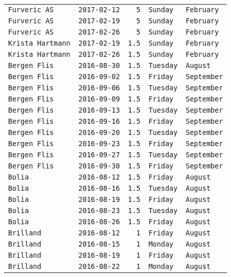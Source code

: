 \documentclass[11pt,A4paper,]{article}
\begin{document}
\begin{longtable}[]{@{}lrrll@{}}
\texttt{Furveric\ AS} & \texttt{2017-02-12} & \texttt{5} &
\texttt{Sunday} & \texttt{February}\tabularnewline
\texttt{Furveric\ AS} & \texttt{2017-02-19} & \texttt{5} &
\texttt{Sunday} & \texttt{February}\tabularnewline
\texttt{Furveric\ AS} & \texttt{2017-02-26} & \texttt{5} &
\texttt{Sunday} & \texttt{February}\tabularnewline
\texttt{Krista\ Hartmann} & \texttt{2017-02-19} & \texttt{1.5} &
\texttt{Sunday} & \texttt{February}\tabularnewline
\texttt{Krista\ Hartmann} & \texttt{2017-02-26} & \texttt{1.5} &
\texttt{Sunday} & \texttt{February}\tabularnewline
\texttt{Bergen\ Flis} & \texttt{2016-08-30} & \texttt{1.5} &
\texttt{Tuesday} & \texttt{August}\tabularnewline
\texttt{Bergen\ Flis} & \texttt{2016-09-02} & \texttt{1.5} &
\texttt{Friday} & \texttt{September}\tabularnewline
\texttt{Bergen\ Flis} & \texttt{2016-09-06} & \texttt{1.5} &
\texttt{Tuesday} & \texttt{September}\tabularnewline
\texttt{Bergen\ Flis} & \texttt{2016-09-09} & \texttt{1.5} &
\texttt{Friday} & \texttt{September}\tabularnewline
\texttt{Bergen\ Flis} & \texttt{2016-09-13} & \texttt{1.5} &
\texttt{Tuesday} & \texttt{September}\tabularnewline
\texttt{Bergen\ Flis} & \texttt{2016-09-16} & \texttt{1.5} &
\texttt{Friday} & \texttt{September}\tabularnewline
\texttt{Bergen\ Flis} & \texttt{2016-09-20} & \texttt{1.5} &
\texttt{Tuesday} & \texttt{September}\tabularnewline
\texttt{Bergen\ Flis} & \texttt{2016-09-23} & \texttt{1.5} &
\texttt{Friday} & \texttt{September}\tabularnewline
\texttt{Bergen\ Flis} & \texttt{2016-09-27} & \texttt{1.5} &
\texttt{Tuesday} & \texttt{September}\tabularnewline
\texttt{Bergen\ Flis} & \texttt{2016-09-30} & \texttt{1.5} &
\texttt{Friday} & \texttt{September}\tabularnewline
\texttt{Bolia} & \texttt{2016-08-12} & \texttt{1.5} & \texttt{Friday} &
\texttt{August}\tabularnewline
\texttt{Bolia} & \texttt{2016-08-16} & \texttt{1.5} & \texttt{Tuesday} &
\texttt{August}\tabularnewline
\texttt{Bolia} & \texttt{2016-08-19} & \texttt{1.5} & \texttt{Friday} &
\texttt{August}\tabularnewline
\texttt{Bolia} & \texttt{2016-08-23} & \texttt{1.5} & \texttt{Tuesday} &
\texttt{August}\tabularnewline
\texttt{Bolia} & \texttt{2016-08-26} & \texttt{1.5} & \texttt{Friday} &
\texttt{August}\tabularnewline
\texttt{Brilland} & \texttt{2016-08-12} & \texttt{1} & \texttt{Friday} &
\texttt{August}\tabularnewline
\texttt{Brilland} & \texttt{2016-08-15} & \texttt{1} & \texttt{Monday} &
\texttt{August}\tabularnewline
\texttt{Brilland} & \texttt{2016-08-19} & \texttt{1} & \texttt{Friday} &
\texttt{August}\tabularnewline
\texttt{Brilland} & \texttt{2016-08-22} & \texttt{1} & \texttt{Monday} &
\texttt{August}\tabularnewline

\end{longtable}
\end{document}
